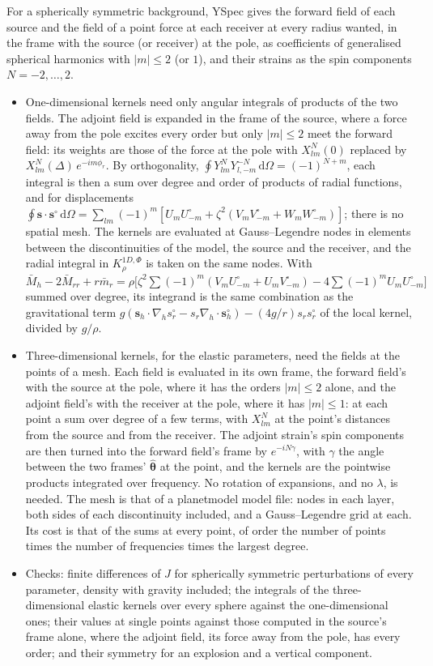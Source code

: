 \documentclass[11pt,a4paper]{article}
\newcommand{\bs}{\mathbf{s}}
\newcommand{\sd}{\mathbf{s}^\circ}
\newcommand{\dd}{\,\mathrm{d}}
\theoremstyle{remark}
\begin{document}
For a spherically symmetric background, YSpec gives the forward field of
each source and the field of a point force at each receiver at every radius
wanted, in the frame with the source (or receiver) at the pole, as
coefficients of generalised spherical harmonics with $|m|\le2$ (or $1$), and
their strains as the spin components $N=-2,\dots,2$.
\begin{itemize}
\item One-dimensional kernels need only angular integrals of products of the
  two fields. The adjoint field is expanded in the frame of the source, where
  a force away from the pole excites every order but only $|m|\le2$ meet the
  forward field: its weights are those of the force at the pole with
  $X^N_{lm}(0)$ replaced by $X^N_{lm}(\Delta)\,e^{-im\phi_r}$. By
  orthogonality, $\oint Y^N_{lm}Y^{-N}_{l,-m}\dd\Omega = (-1)^{N+m}$, each
  integral is then a sum over degree and order of products of radial
  functions, and for displacements $\oint\bs\cdot\sd\dd\Omega =
  \sum_{lm}(-1)^m[U_mU^\circ_{-m} + \zeta^2(V_mV^\circ_{-m} +
  W_mW^\circ_{-m})]$; there is no spatial mesh. The kernels are evaluated at
  Gauss--Legendre nodes in elements between the discontinuities of the
  model, the source and the receiver, and the radial integral in $K^{1D,\Phi}_\rho$ is
  taken on the same nodes. With $\bar M_h - 2\bar M_{rr} + r\bar m_r =
  \rho\big[\zeta^2\sum(-1)^m(V_mU^\circ_{-m} + U_mV^\circ_{-m}) -
  4\sum(-1)^mU_mU^\circ_{-m}\big]$ summed over degree, its integrand is the
  same combination as the gravitational term $g(\bs_h\cdot\nabla_hs^\circ_r
  - s_r\nabla_h\cdot\sd_h) - (4g/r)s_rs^\circ_r$ of the local kernel, divided
  by $g/\rho$.
\item Three-dimensional kernels, for the elastic parameters, need the
  fields at the points of a mesh. Each field is evaluated in its own frame,
  the forward field's with the source at the pole, where it has the orders
  $|m|\le2$ alone, and the adjoint field's with the receiver at the pole,
  where it has $|m|\le1$: at each point a sum over degree of a few terms,
  with $X^N_{lm}$ at the point's distances from the source and from the
  receiver. The adjoint strain's spin components are then turned into the
  forward field's frame by $e^{-iN\gamma}$, with $\gamma$ the angle between
  the two frames' $\hat{\bm\theta}$ at the point, and the kernels are the
  pointwise products integrated over frequency. No rotation of expansions,
  and no $\lambda$, is needed. The mesh is that of a planetmodel model file:
  nodes in each layer, both sides of each discontinuity included, and a
  Gauss--Legendre grid at each. Its cost is that of the sums at every point,
  of order the number of points times the number of frequencies times the
  largest degree.
\item Checks: finite differences of $J$ for spherically symmetric
  perturbations of every parameter, density with gravity included; the
  integrals of the three-dimensional elastic kernels over every sphere
  against the one-dimensional ones; their values at single points against
  those computed in the source's frame alone, where the adjoint field, its
  force away from the pole, has every order; and their symmetry for an
  explosion and a vertical component.
\end{itemize}
\end{document}
